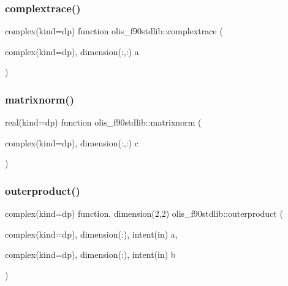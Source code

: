 \mbox{\label{namespaceolis__f90stdlib_aaa6e9aabcf33a6f7052e1db5aa5dcf70}} 
\subsubsection{\texorpdfstring{complextrace()}{complextrace()}}
{\footnotesize\ttfamily complex(kind=dp) function olis\+\_\+f90stdlib\+::complextrace (\begin{DoxyParamCaption}\item[{complex(kind=dp), dimension(\+:,\+:)}]{a }\end{DoxyParamCaption})}

\mbox{\label{namespaceolis__f90stdlib_a43175b11cfecf961b5e6e597cfb2f848}} 
\subsubsection{\texorpdfstring{matrixnorm()}{matrixnorm()}}
{\footnotesize\ttfamily real(kind=dp) function olis\+\_\+f90stdlib\+::matrixnorm (\begin{DoxyParamCaption}\item[{complex(kind=dp), dimension(\+:,\+:)}]{c }\end{DoxyParamCaption})}

\mbox{\label{namespaceolis__f90stdlib_a9b646e61678500e78a9c48747a07bdf0}} 
\subsubsection{\texorpdfstring{outerproduct()}{outerproduct()}}
{\footnotesize\ttfamily complex(kind=dp) function, dimension(2,2) olis\+\_\+f90stdlib\+::outerproduct (\begin{DoxyParamCaption}\item[{complex(kind=dp), dimension(\+:), intent(in)}]{a,  }\item[{complex(kind=dp), dimension(\+:), intent(in)}]{b }\end{DoxyParamCaption})}

